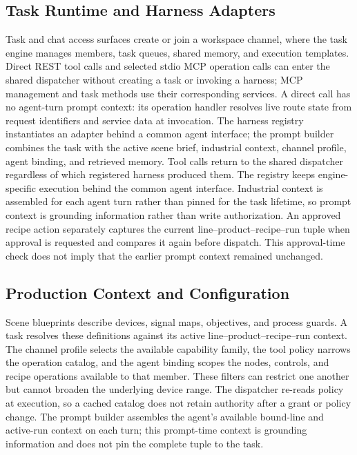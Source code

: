 \subsection{Task Runtime and Harness Adapters}
Task and chat access surfaces create or join a workspace channel, where the
task engine manages members, task queues, shared memory, and execution
templates. Direct REST tool calls and selected stdio MCP operation calls can
enter the shared dispatcher without creating a task or invoking a harness;
MCP management and task methods use their corresponding services. A direct
call has no agent-turn prompt context: its operation handler resolves live
route state from request identifiers and service data at invocation.
The harness registry instantiates an adapter behind a common agent interface;
the prompt builder combines the task with the active scene brief, industrial
context, channel profile, agent binding, and retrieved memory. Tool calls
return to the shared dispatcher regardless of which registered harness
produced them. The registry keeps engine-specific execution behind the common
agent interface. Industrial context is assembled for
each agent turn rather than pinned for the task lifetime, so prompt context is
grounding information rather than write authorization. An approved recipe
action separately captures the current line--product--recipe--run tuple when
approval is requested and compares it again before dispatch. This
approval-time check does not imply that the earlier prompt context remained
unchanged.

\subsection{Production Context and Configuration}
Scene blueprints describe devices, signal maps, objectives, and process
guards. A task resolves these definitions against its active
line--product--recipe--run context. The channel profile selects the available
capability family, the tool policy narrows the operation catalog, and the
agent binding scopes the nodes, controls, and recipe operations available to
that member. These filters can restrict one another but cannot broaden the
underlying device range. The dispatcher re-reads policy at execution, so a
cached catalog does not retain authority after a grant or policy change. The
prompt builder assembles the agent's available bound-line and active-run
context on each turn; this prompt-time context is grounding information and
does not pin the complete tuple to the task.

